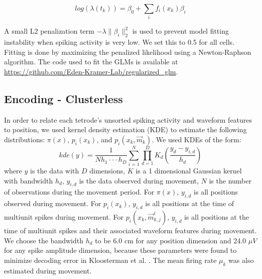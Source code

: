 \documentclass[times, twoside]{zHenriquesLab-StyleBioRxiv}
\begin{document}
$$log(\lambda(t_k)) = \beta_{0} + \sum_{i} f_{i}(x_k)\beta_{i}$$

A small L2 penalization term $-\lambda\|\beta_{i}\|_{2}^{2}$ is used to prevent model fitting instability when spiking activity is very low. We set this to 0.5 for all cells. Fitting is done by maximizing the penalized likelihood using a Newton-Raphson algorithm. The code used to fit the GLMs is available at \url{https://github.com/Eden-Kramer-Lab/regularized_glm}.

\subsection*{Encoding - Clusterless}
In order to relate each tetrode's unsorted spiking activity and waveform features to position, we used kernel density estimation (KDE) to estimate the following distributions: $\pi(x)$, $p_{i}(x_k)$, and $p_{i}(x_k, \vec{m}_k)$. We used KDEs of the form: 
$$
kde(y) = \frac{1}{N h_1\cdot\cdot\cdot h_D} \sum^{N}_{i=1} \prod^{D}_{d=1} K_{d}\left(\frac{y_d - y_{i,d}}{h_d}\right)
$$
where $y$ is the data with $D$ dimensions, $K$ is a 1 dimensional Gaussian kernel with bandwidth $h_d$, $y_{i, d}$ is the data observed during movement, $N$ is the number of observations during the movement period. For $\pi(x)$, $y_{i, d}$ is all positions observed during movement. For $p_{i}(x_k)$, $y_{i, d}$ is all positions at the time of multiunit spikes during movement. For $p_{i}(x_k, \vec{m}^i_{k,j})$, $y_{i, d}$ is all positions at the time of multiunit spikes and their associated waveform features during movement. We choose the bandwidth $h_d$ to be 6.0 cm for any position dimension and 24.0 $\mu V$ for any spike amplitude dimension, because these parameters were found to minimize decoding error in Kloosterman et al. \cite{KloostermanBayesiandecodingusing2014}. The mean firing rate $\mu_k$ was also estimated during movement.
\end{document}
